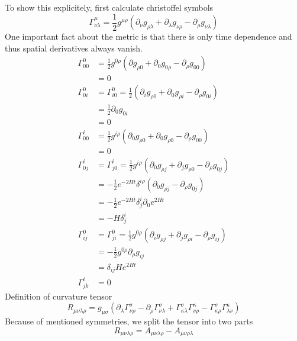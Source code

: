 \begin{enumerate}[label=(\alph*)]
      To show this explicitely, first calculate christoffel symbols
      \begin{equation}
         \Gamma_{\nu\lambda}^{\mu} = \frac{1}{2} g^{\mu \rho} \left( \partial_\nu g_{\rho\lambda} + \partial_\lambda g_{\nu\rho} - \partial_\rho g_{\nu\lambda} \right)
      \end{equation}
      One important fact about the metric is that there is only time dependence and thus spatial derivatives always vanish.
      \begin{align*}
         \Gamma_{00}^{0} &= \frac{1}{2} g^{0 \rho} (\partial g_{\rho 0} + \partial_0 g_{0 \rho} - \partial_\rho g_{00}) \\ 
                        &= 0 \\
         \Gamma_{0i}^{0} &= \Gamma_{i0}^{0} = \frac{1}{2} \left( \partial_i g_{\rho 0} + \partial_0 g_{\rho i} - \partial_{\rho} g_{0i}  \right) \\
                         &= \frac{1}{2} \partial_0 g_{0i} \\
                         &= 0\\
         \Gamma^{i}_{00} &= \frac{1}{2} g^{i\rho} (\partial_0 g_{\rho 0} + \partial_0 g_{\rho 0} - \partial_\rho g_{00}) \\
                         &= 0 \\
         \Gamma^{i}_{0j} &= \Gamma_{j0}^{i} = \frac{1}{2} g^{i \rho} \left( \partial_0 g_{\rho j} + \partial_j g_{\rho 0} - \partial_\rho g_{0j} \right) \\
                         &= - \frac{1}{2} e^{-2Ht} \delta^{i\rho} \left( \partial_0 g_{\rho j} - \partial_\rho g_{0j} \right)  \\
                         &= - \frac{1}{2} e^{-2Ht} \delta_j^i \partial_0 e^{2Ht} \\
                         &= - H \delta_j^i  \\
         \Gamma^{0}_{ij} &= \Gamma^{0}_{ji} = \frac{1}{2} g^{0\rho} \left( \partial_i g_{\rho j} + \partial_j g_{\rho i} - \partial_\rho g_{ij} \right) \\
                         &= -\frac{1}{2} g^{0\rho} \partial_\rho g_{ij} \\
                         &= \delta_{ij} H e^{2Ht} \\
         \Gamma^{i}_{jk} &= 0
      \end{align*}
      Definition of curvature tensor
      \begin{equation}
         R_{\mu\nu \lambda \rho} = g_{\mu\sigma} \left( \partial_\lambda \Gamma^\sigma_{\nu\rho} - \partial_\rho \Gamma^{\sigma}_{\nu\lambda} + \Gamma^{\sigma}_{\kappa \lambda}\Gamma^{\kappa}_{\nu\rho} - \Gamma^{\sigma}_{\kappa \rho} \Gamma^{\kappa}_{\lambda \nu} \right)
      \end{equation}
      Because of mentioned symmetries, we split the tensor into two parts
      \begin{equation*}
         R_{\mu\nu \lambda \rho} = A_{\mu\nu\lambda \rho} - A_{\mu\nu\rho\lambda}
      \end{equation*}


\end{enumerate}
